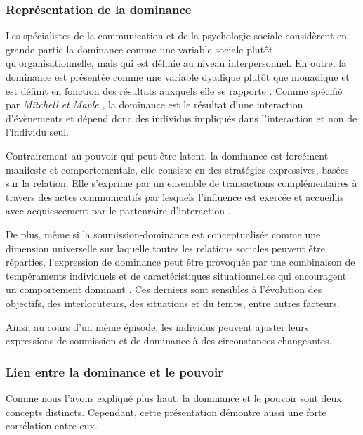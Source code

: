 		
			\subsubsection{Représentation de la dominance}
			
				Les spécialistes de la communication et de la psychologie sociale considèrent en grande partie la dominance comme une variable sociale plutôt qu'organisationnelle, mais qui est définie au niveau interpersonnel. En outre, la dominance est présentée comme une variable dyadique plutôt que monadique et est définit en fonction des résultats auxquels elle se rapporte  \cite{burgoon1998nature,burgoon2006nonverbal}.
				Comme spécifié par \emph{Mitchell et Maple} \cite{smither1993authoritarianism}, la dominance est le résultat d'une interaction d'évènements et dépend donc des individus impliqués dans l'interaction et non de l'individu seul.
				
				Contrairement au pouvoir qui peut être latent, la dominance est forcément manifeste et comportementale, elle consiste en des stratégies expressives, basées sur la relation. Elle s'exprime par un ensemble de transactions complémentaires à travers des actes communicatifs par lesquels l'influence est exercée et accueillis avec acquiescement par le partenraire d'interaction \cite{burgoon2000interactionist,millar1987relational}. 
				
				De plus, même si la soumission-dominance est conceptualisée comme une dimension universelle sur laquelle toutes les relations sociales peuvent être réparties, l'expression de dominance peut être provoquée par une combinaison de tempéraments individuels et de caractéristiques situationnelles qui encouragent un comportement dominant \cite{burgoon2000interactionist}. Ces derniers sont sensibles à l'évolution des objectifs, des interlocuteurs, des situations et du temps, entre autres facteurs.
				
				Ainsi, au cours d'un même épisode, les individus peuvent ajuster leurs expressions de soumission et de dominance à des circonstances changeantes.
				
				\subsubsection{Lien entre la dominance et le pouvoir}
				
				Comme nous l'avons expliqué plus haut, la dominance et le pouvoir sont deux concepts distincts. Cependant, cette présentation démontre aussi une forte corrélation entre eux. 
				
